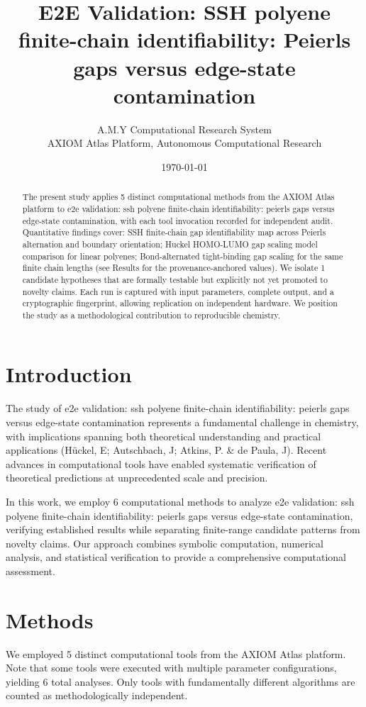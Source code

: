 \documentclass[11pt,a4paper]{article}
\title{E2E Validation: SSH polyene finite-chain identifiability: Peierls gaps versus edge-state contamination}
\author{A.M.Y Computational Research System\\
\small AXIOM Atlas Platform, Autonomous Computational Research}
\date{\today}
\begin{document}
\maketitle

\begin{abstract}
The present study applies 5 distinct computational methods from the AXIOM Atlas platform to e2e validation: ssh polyene finite-chain identifiability: peierls gaps versus edge-state contamination, with each tool invocation recorded for independent audit. Quantitative findings cover: SSH finite-chain gap identifiability map across Peierls alternation and boundary orientation; Huckel HOMO-LUMO gap scaling model comparison for linear polyenes; Bond-alternated tight-binding gap scaling for the same finite chain lengths (see Results for the provenance-anchored values). We isolate 1 candidate hypotheses that are formally testable but explicitly not yet promoted to novelty claims. Each run is captured with input parameters, complete output, and a cryptographic fingerprint, allowing replication on independent hardware. We position the study as a methodological contribution to reproducible chemistry.
\end{abstract}

\section{Introduction}
The study of e2e validation: ssh polyene finite-chain identifiability: peierls gaps versus edge-state contamination represents a fundamental challenge in chemistry, with implications spanning both theoretical understanding and practical applications (Hückel, E; Autschbach, J; Atkins, P. \& de Paula, J). Recent advances in computational tools have enabled systematic verification of theoretical predictions at unprecedented scale and precision.

In this work, we employ 6 computational methods to analyze e2e validation: ssh polyene finite-chain identifiability: peierls gaps versus edge-state contamination, verifying established results while separating finite-range candidate patterns from novelty claims. Our approach combines symbolic computation, numerical analysis, and statistical verification to provide a comprehensive computational assessment.


\section{Methods}
We employed 5 distinct computational tools from the AXIOM Atlas platform. Note that some tools were executed with multiple parameter configurations, yielding 6 total analyses. Only tools with fundamentally different algorithms are counted as methodologically independent.
\end{document}
